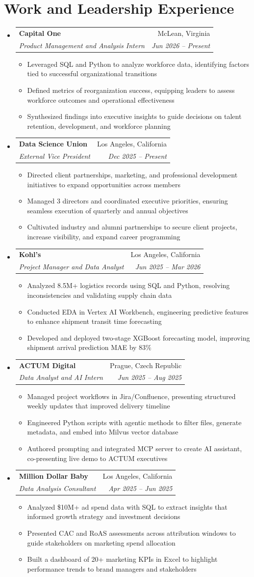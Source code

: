 \documentclass[letterpaper,11pt]{article}
\makeatletter
\newcommand{\resumeItem}[1]{\item\small{#1}}
\newcommand{\resumeSubheading}[4]{
  \vspace{-2pt}\item
    \begin{tabular*}{\textwidth}[t]{l@{\extracolsep{\fill}}r}
      \textbf{#1} & #2 \\
      \textit{\small#3} & \textit{\small #4} \\
    \end{tabular*}\vspace{-7pt}
}
\newcommand{\resumeSubHeadingListStart}{\begin{itemize}[leftmargin=0in, label={}]}
\newcommand{\resumeSubHeadingListEnd}{\end{itemize}}
\newcommand{\resumeItemListStart}{\begin{itemize}[itemsep= 1.5pt, parsep=0pt]}
\newcommand{\resumeItemListEnd}{\end{itemize}\vspace{-5pt}}
\makeatother
\begin{document}
\section{Work and Leadership Experience}
  \resumeSubHeadingListStart
    \resumeSubheading
      {Capital One}{McLean, Virginia}
      {Product Management and Analysis Intern}{Jun 2026 -- Present}
      \resumeItemListStart
        \resumeItem{Leveraged SQL and Python to analyze workforce data, identifying factors tied to successful organizational transitions}
        \resumeItem{Defined metrics of reorganization success, equipping leaders to assess workforce outcomes and operational effectiveness}
        \resumeItem{Synthesized findings into executive insights to guide decisions on talent retention, development, and workforce planning}
      \resumeItemListEnd
    \resumeSubheading
      {Data Science Union}{Los Angeles, California}
      {External Vice President}{Dec 2025 -- Present}
      \resumeItemListStart
        \resumeItem{Directed client partnerships, marketing, and professional development initiatives to expand opportunities across members}
        \resumeItem{Managed 3 directors and coordinated executive priorities, ensuring seamless execution of quarterly and annual objectives}
        \resumeItem{Cultivated industry and alumni partnerships to secure client projects, increase visibility, and expand career programming}
      \resumeItemListEnd
    \resumeSubheading
      {Kohl's}{Los Angeles, California}
      {Project Manager and Data Analyst}{Jun 2025 -- Mar 2026}
      \resumeItemListStart
        \resumeItem{Analyzed 8.5M+ logistics records using SQL and Python, resolving inconsistencies and validating supply chain data}
        \resumeItem{Conducted EDA in Vertex AI Workbench, engineering predictive features to enhance shipment transit time forecasting}
        \resumeItem{Developed and deployed two-stage XGBoost forecasting model, improving shipment arrival prediction MAE by 83\%}
      \resumeItemListEnd
    \resumeSubheading
      {ACTUM Digital}{Prague, Czech Republic}
      {Data Analyst and AI Intern}{Jun 2025 -- Aug 2025}
      \resumeItemListStart
        \resumeItem{Managed project workflows in Jira/Confluence, presenting structured weekly updates that improved delivery timeline}
        \resumeItem{Engineered Python scripts with agentic methods to filter files, generate metadata, and embed into Milvus vector database}
        \resumeItem{Authored prompting and integrated MCP server to create AI assistant, co-presenting live demo to ACTUM executives}
      \resumeItemListEnd
    \resumeSubheading
      {Million Dollar Baby}{Los Angeles, California}
      {Data Analysis Consultant}{Apr 2025 -- Jun 2025}
      \resumeItemListStart
        \resumeItem{Analyzed \$10M+ ad spend data with SQL to extract insights that informed growth strategy and investment decisions}
        \resumeItem{Presented CAC and RoAS assessments across attribution windows to guide stakeholders on marketing spend allocation}
        \resumeItem{Built a dashboard of 20+ marketing KPIs in Excel to highlight performance trends to brand managers and stakeholders}
      \resumeItemListEnd
  \resumeSubHeadingListEnd
\end{document}
